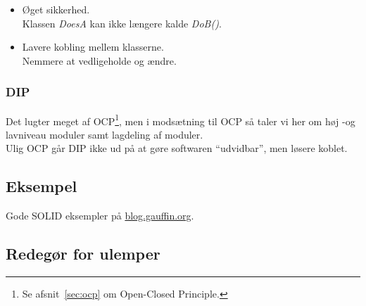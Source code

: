 \begin{itemize}
	\item Øget sikkerhed.\\
	Klassen \textit{DoesA} kan ikke længere kalde \textit{DoB()}.
	\item Lavere kobling mellem klasserne.\\
	Nemmere at vedligeholde og ændre.
\end{itemize}

\subsubsection{DIP}
Det lugter meget af OCP\footnote{Se afsnit~\ref{sec:ocp} om Open-Closed Principle.}, men i modsætning til OCP så taler vi her om høj -og lavniveau moduler samt lagdeling af moduler.\\

Ulig OCP går DIP ikke ud på at gøre softwaren “udvidbar”, men løsere koblet.

\subsection{Eksempel}
Gode SOLID eksempler på \href{http://blog.gauffin.org/2012/05/11/solid-principles-with-real-world-examples/}{blog.gauffin.org}.

\subsection{Redegør for ulemper}